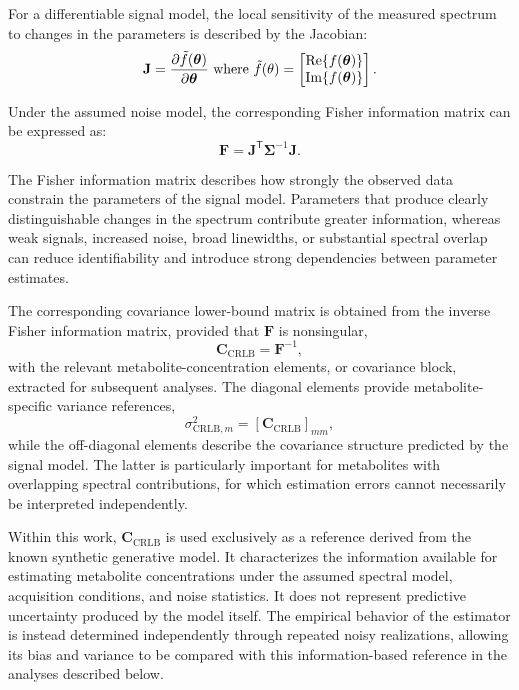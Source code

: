For a differentiable signal model, the local sensitivity of the measured spectrum to changes in the parameters is described by the Jacobian:
\begin{equation}
    \mathbf{J} = \frac{\partial \tilde{f}(\boldsymbol{\theta})}{\partial \boldsymbol{\theta}}\textnormal{ where }
    \tilde{f}(\theta) =
    \begin{bmatrix}
        \textnormal{Re} \{f(\boldsymbol{\theta})\} \\
        \textnormal{Im} \{f(\boldsymbol{\theta})\}
    \end{bmatrix}.
\end{equation}

Under the assumed noise model, the corresponding Fisher information matrix can be expressed as:
\begin{equation}
    \mathbf{F} = \mathbf{J}^{\mathsf T} \boldsymbol{\Sigma}^{-1} \mathbf{J}.
\end{equation}

The Fisher information matrix describes how strong\-ly the observed data constrain the parameters of the signal model. Parameters that produce clearly distinguishable changes in the spectrum contribute greater information, whereas weak signals, increased noise, broad linewidths, or substantial spectral overlap can reduce identifiability and introduce strong dependencies between parameter estimates.

The corresponding covariance lower-bound matrix is obtained from the inverse Fisher information matrix, provided that $\mathbf{F}$ is nonsingular,
\begin{equation}
    \mathbf{C}_{\mathrm{CRLB}} = \mathbf{F}^{-1},
\end{equation}
with the relevant metabolite-concentration elements, or covariance block, extracted for subsequent analyses. The diagonal elements provide metabolite-specific variance references,
\begin{equation}\label{eqn:sigma crlb}
    \sigma_{\mathrm{CRLB},m}^{2} = \left[\mathbf{C}_{\mathrm{CRLB}}\right]_{mm},
\end{equation}
while the off-diagonal elements describe the covariance structure predicted by the signal model. The latter is particularly important for metabolites with overlapping spectral contributions, for which estimation errors cannot necessarily be interpreted independently.

Within this work, $\mathbf{C}_{\mathrm{CRLB}}$ is used exclusively as a reference derived from the known synthetic generative model. It characterizes the information available for estimating metabolite concentrations under the assumed spectral model, acquisition conditions, and noise statistics. It does not represent predictive uncertainty produced by the \DL model itself. The empirical behavior of the \DL estimator is instead determined independently through repeated noisy realizations, allowing its bias and variance to be compared with this information-based reference in the analyses described below.

